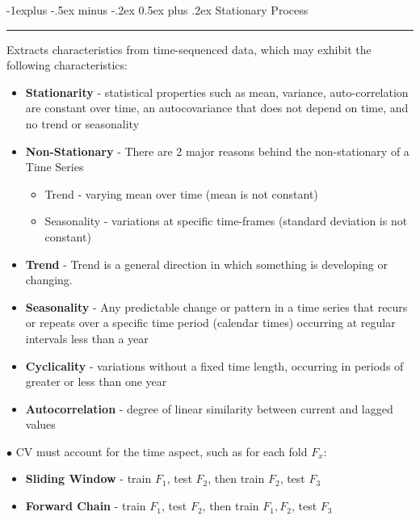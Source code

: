 \documentclass[letterpaper, 10.5pt,landscape]{article}
\makeatletter
\renewcommand{\subsection}{\@startsection{subsection}{2}{0mm}%
                                {-1explus -.5ex minus -.2ex}%
                                {0.5ex plus .2ex}%
                                {\normalfont\normalsize\bfseries}}
\makeatother
\begin{document}
\begin{multicols*}{3}
\subsection{Stationary Process} {\color{teal}\hrule height 0.5pt} \smallskip








Extracts characteristics from time-sequenced data, which may exhibit the following characteristics:
\begin{itemize}[label={--},leftmargin=4mm]
\vspace{-3pt}
\item \textbf{Stationarity} - statistical properties such as mean, variance, auto-correlation are constant over time, an autocovariance that does not depend on time, and no trend or seasonality
\vspace{-3pt}
\item \textbf{Non-Stationary} - There are 2 major reasons behind the non-stationary of a Time Series 
\vspace{-3pt}
    \begin{itemize}
        \vspace{-3pt}
        \item Trend - varying mean over time (mean is not constant)
        \vspace{-3pt}
        \item Seasonality - variations at specific time-frames (standard deviation is not constant)
    \end{itemize}
    
\item \textbf{Trend} - Trend is a general direction in which something is developing or changing.
\vspace{-3pt}
\item \textbf{Seasonality} - Any predictable change or pattern in a time series that recurs or repeats over a specific time period (calendar times) occurring at regular intervals less than a year
\vspace{-3pt}
\item \textbf{Cyclicality} - variations without a fixed time length, occurring in periods of greater or less than one year
\vspace{-3pt}
\item \textbf{Autocorrelation} - degree of linear similarity between current and lagged values
\end{itemize}


$\bullet$ CV must account for the time aspect, such as for each fold $F_x$:
\begin{itemize}[label={--},leftmargin=4mm]
\vspace{-3pt}
\item \textbf{Sliding Window} - train $F_1$, test $F_2$, then train $F_2$, test $F_3$
\vspace{-3pt}
\item \textbf{Forward Chain} - train $F_1$, test $F_2$, then train $F_1, F_2$, test $F_3$
\end{itemize}


\end{multicols*}
\end{document}
